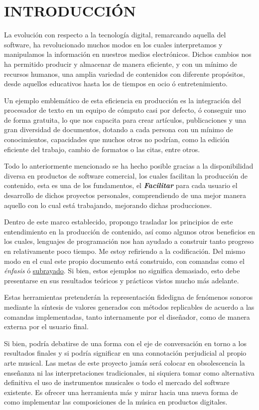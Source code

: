 \documentclass{book}
\begin{document}
	\section*{INTRODUCCIÓN}
	La evolución con respecto a la tecnología digital, remarcando aquella del software, ha revolucionado muchos modos en los cuales interpretamos y manipulamos la información en nuestros medios electrónicos. Dichos cambios nos ha permitido producir y almacenar de manera eficiente, y con un mínimo de recursos humanos, una amplia variedad de contenidos con diferente propósitos, desde aquellos educativos hasta los de tiempos en ocio ó entretenimiento.\par
	Un ejemplo emblemático de esta eficiencia en producción es la integración del procesador de texto en un equipo de cómputo casi por defecto, ó conseguir uno de forma gratuita, lo que nos capacita para crear artículos, publicaciones y una gran diversidad de documentos, dotando a cada persona con un mínimo de conocimientos, capacidades que muchos otros no podrían, como la edición eficiente del trabajo, cambio de formatos o las citas, entre otros.\par
	Todo lo anteriormente mencionado se ha hecho posible gracias a la disponibilidad diversa en productos de software comercial, los cuales facilitan la producción de contenido, esta es una de los fundamentos, el \textbf{\emph{Facilitar}} para cada usuario el desarrollo de dichos proyectos personales, comprendiendo de una mejor manera aquello con lo cual está trabajando, mejorando dichas producciones.\par
	Dentro de este marco establecido, propongo trasladar los principios de este entendimiento en la producción de contenido, así como algunos otros beneficios en los cuales, lenguajes de programación nos han ayudado a construir tanto progreso en relativamente poco tiempo. Me estoy refiriendo a la codificación. Del mismo modo en el cual este propio documento está construido, con comandas como el \emph{énfasis} ó \underline{subrayado}. Si bien, estos ejemplos no significa demasiado, esto debe presentarse en sus resultados teóricos y prácticos vistos mucho más adelante.\par
	Estas herramientas pretenderán la representación fidedigna de fenómenos sonoros mediante la síntesis de valores generados con métodos replicables de acuerdo a las comandas implementadas, tanto internamente por el diseñador, como de manera externa por el usuario final.\par
	Si bien, podría debatirse de una forma con el eje de conversación en torno a los resultados finales y si podría significar en una connotación perjudicial al propio arte musical. Las metas de este proyecto jamás será colocar en obsolescencia la enseñanza ni las interpretaciones tradicionales, ni siquiera tomar como alternativa definitiva el uso de instrumentos musicales o todo el mercado del software existente. Es ofrecer una herramienta más y mirar hacia una nueva forma de como implementar las composiciones de la música en productos digitales.\par\pagebreak
\end{document}
